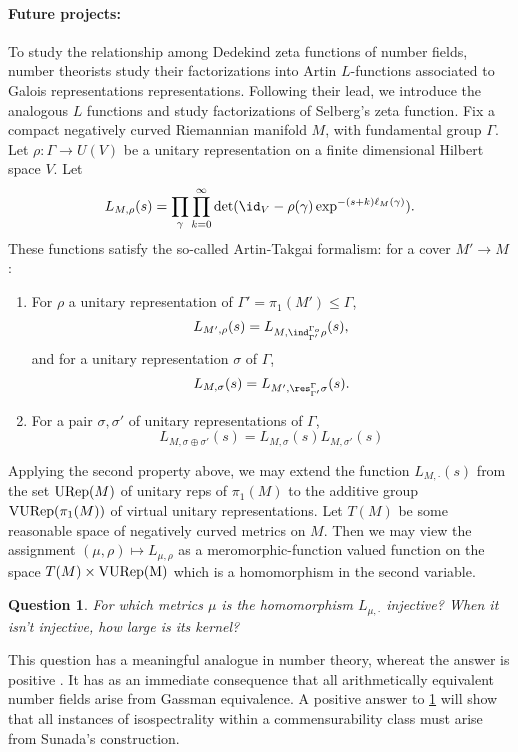 \documentclass[11pt]{article}
\newtheorem{question}{Question}
\begin{document}
\paragraph{Future projects:}
	
	To study the relationship among Dedekind zeta functions of number fields, number theorists study their factorizations into Artin $L$-functions associated to Galois representations representations. Following their lead, we introduce the analogous $L$ functions and study factorizations of Selberg's zeta function. Fix a compact negatively curved Riemannian manifold $M$, with fundamental group $\Gamma$. Let $\rho: \Gamma \to U(V)$ be a unitary representation on a finite dimensional Hilbert space $V$. Let
	\[	L_{M,\rho}(s) = \prod_{\gamma} \prod_{k=0}^\infty   \det ( \id_V -  \rho(\gamma)\exp^{-(s+k) \ell_M(\gamma) }  ) .\label{slf}\]
	These functions satisfy the so-called Artin-Takgai formalism: for a cover $M' \to M$ :
	\begin{enumerate}
		
		\item  For $\rho$ a unitary representation of $\Gamma' = \pi_1( M' ) \leq \Gamma$, 
		\[ L_{M',\rho} (s)  = L_{M, \ind_{\Gamma'}^{\Gamma_o} \rho} (s),
		\]  
		and for a unitary representation $\sigma$ of $\Gamma$,
		\[ L_{M,\sigma} (s)  = L_{M',\res_{\Gamma'}^{\Gamma}\sigma} (s). \]
		\item For a pair $\sigma, \sigma'$ of unitary representations of $\Gamma$, 
		\[ L_{M,\sigma \oplus \sigma' }(s) = L_{M,\sigma}(s) L_{M,\sigma'}(s) \]
	\end{enumerate}
	Applying the second property above, we may extend the function $L_{M,\cdot} (s)$ from the set ${\rm URep}(M)$ of unitary reps of $\pi_1(M)$ to the additive group ${\rm VURep}(\pi_1(M))$ of virtual unitary representations. Let $T(M)$ be some reasonable space of negatively curved metrics on $M$. Then we may view the assignment $(\mu,\rho) \mapsto L_{\mu,\rho}$ as a meromorphic-function valued function on the space $T(M) \times {\rm VURep(M)}$ which is a homomorphism in the second variable. 
	
	\begin{question}\label{q:multind}
		For which metrics $\mu$ is the homomorphism $L_{\mu, \cdot}$ injective? When it isn't injective, how large is its kernel? 
	\end{question} 
	
	This question has a meaningful analogue in number theory, whereat the answer is positive \cite{funakura1978}. It has as an immediate consequence that all arithmetically equivalent number fields arise from Gassman equivalence\cite{perlis1977}. A positive answer to \cref{q:multind} will show that all instances of isospectrality within a commensurability class must arise from Sunada's construction. 
	
\end{document}
